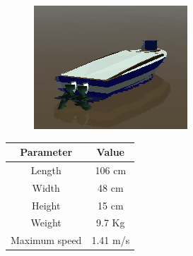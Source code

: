     \begin{minipage}{\textwidth}
        \begin{minipage}[b]{0.35\textwidth}
        \centering
        \begin{figure}[H]
            \centering
            \includegraphics[scale=0.75]{figs/Chap5/diffboat.png}
        \end{figure}
        \label{fig:diffboat}
        \end{minipage}
        \begin{minipage}[b]{0.5\textwidth}
        \centering
            \begin{tabular}{cc}
                \toprule
                    \textbf{Parameter}       & \textbf{Value}       \\
                \midrule
                    Length          & 106 cm      \\
                    Width           & 48 cm       \\
                    Height          & 15 cm       \\
                    Weight          & 9.7 Kg      \\
                    Maximum speed   & 1.41 m/s    \\ 
                \bottomrule
            \end{tabular}
        \label{tab:diffboat_specs}
        \end{minipage}
    \end{minipage}
    
    \vskip 1cm
    
